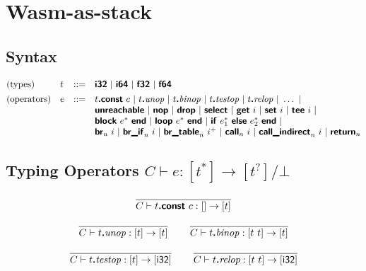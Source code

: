 \documentclass[a4paper]{scrartcl}
\newcommand\void[1]{}
\newcommand\x[1]{\ensuremath{\mathit{#1}}\xspace}
\newcommand\K[1]{\ensuremath{\textsf{#1}}}
\newcommand\KK[1]{\ensuremath{\K{\textbf{#1}}}}
\begin{document}

\section{Wasm-as-stack}

\newcommand\orbot{/\bot}
\newcommand\poly[1]{\bot}
\newcommand\botrule[1]{#1}



\subsection*{Syntax}

$$
\begin{array}{@{}llcl@{}}
\text{(types)} & t &::=&
  \KK{i32} ~|~
  \KK{i64} ~|~
  \KK{f32} ~|~
  \KK{f64} \\
[1ex]
\void{
\text{(result)} & t &::=&
  [t^\ast] ~|~
  \bot \\
[1ex]
}
\text{(operators)} & e &::=&
  t\KK{.const}~c ~|~
  t\KK{.}\x{unop} ~|~
  t\KK{.}\x{binop} ~|~
  t\KK{.}\x{testop} ~|~
  t\KK{.}\x{relop} ~|~
  \dots ~|~ \\&&&
  \KK{unreachable} ~|~
  \KK{nop} ~|~
  \KK{drop} ~|~
  \KK{select} ~|~
  \KK{get}~i ~|~
  \KK{set}~i ~|~
  \KK{tee}~i ~|~ \\&&&
  \KK{block}~e^\ast~\KK{end} ~|~
  \KK{loop}~e^\ast~\KK{end} ~|~
  \KK{if}~e_1^\ast~\KK{else}~e_2^\ast~\KK{end} ~|~ \\&&&
  \KK{br}_n~i ~|~
  \KK{br\_if}_n~i ~|~
  \KK{br\_table}_n~i^+ ~|~
  \KK{call}_n~i ~|~
  \KK{call\_indirect}_n~i ~|~
  \KK{return}_n \\
\end{array}
$$


\subsection*{Typing Operators \hfill $\boxed{C \vdash e : [t^\ast] \to [t^?]\orbot}$}

\botrule{\vspace{-0.5\baselineskip}}
$$
\frac{
}{
  C \vdash t\KK{.const}~c : [] \to [t]
}
$$

$$
\frac{
}{
  C \vdash t\KK{.}\x{unop} : [t] \to [t]
}
\qquad
\frac{
}{
  C \vdash t\KK{.}\x{binop} : [t~t] \to [t]
}
$$

$$
\frac{
}{
  C \vdash t\KK{.}\x{testop} : [t] \to [\K{i32}]
}
\qquad
\frac{
}{
  C \vdash t\KK{.}\x{relop} : [t~t] \to [\K{i32}]
}
$$
\end{document}
